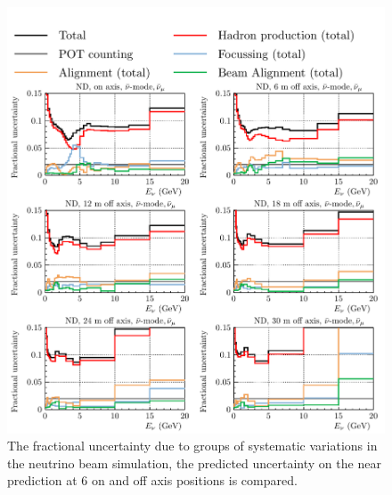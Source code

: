 \documentclass{article}
\begin{document}
\begin{figure}
  \centering
  \includegraphics[width=\textwidth]{plots/fracerrs/nubarmode_numubar_ErrType_OffAxis}
  \caption{The fractional uncertainty due to groups of systematic variations in the neutrino beam simulation, the predicted uncertainty on the near prediction at 6 on and off axis positions is compared.}
  \label{fig:grp_nubar_numubar_offaxis}
\end{figure}
\end{document}
